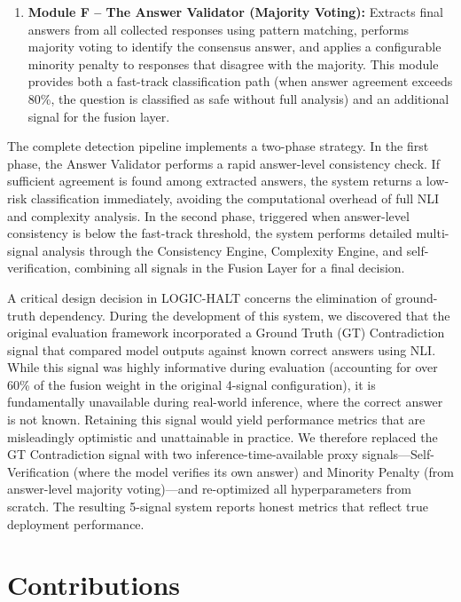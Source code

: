 \begin{enumerate}
    \item \textbf{Module F -- The Answer Validator (Majority Voting):} Extracts final answers from all collected responses using pattern matching, performs majority voting to identify the consensus answer, and applies a configurable minority penalty to responses that disagree with the majority. This module provides both a fast-track classification path (when answer agreement exceeds 80\%, the question is classified as safe without full analysis) and an additional signal for the fusion layer.
\end{enumerate}

The complete detection pipeline implements a two-phase strategy. In the first phase, the Answer Validator performs a rapid answer-level consistency check. If sufficient agreement is found among extracted answers, the system returns a low-risk classification immediately, avoiding the computational overhead of full NLI and complexity analysis. In the second phase, triggered when answer-level consistency is below the fast-track threshold, the system performs detailed multi-signal analysis through the Consistency Engine, Complexity Engine, and self-verification, combining all signals in the Fusion Layer for a final decision.

A critical design decision in LOGIC-HALT concerns the elimination of ground-truth dependency. During the development of this system, we discovered that the original evaluation framework incorporated a Ground Truth (GT) Contradiction signal that compared model outputs against known correct answers using NLI. While this signal was highly informative during evaluation (accounting for over 60\% of the fusion weight in the original 4-signal configuration), it is fundamentally unavailable during real-world inference, where the correct answer is not known. Retaining this signal would yield performance metrics that are misleadingly optimistic and unattainable in practice. We therefore replaced the GT Contradiction signal with two inference-time-available proxy signals---Self-Verification (where the model verifies its own answer) and Minority Penalty (from answer-level majority voting)---and re-optimized all hyperparameters from scratch. The resulting 5-signal system reports honest metrics that reflect true deployment performance.

\section{Contributions}

